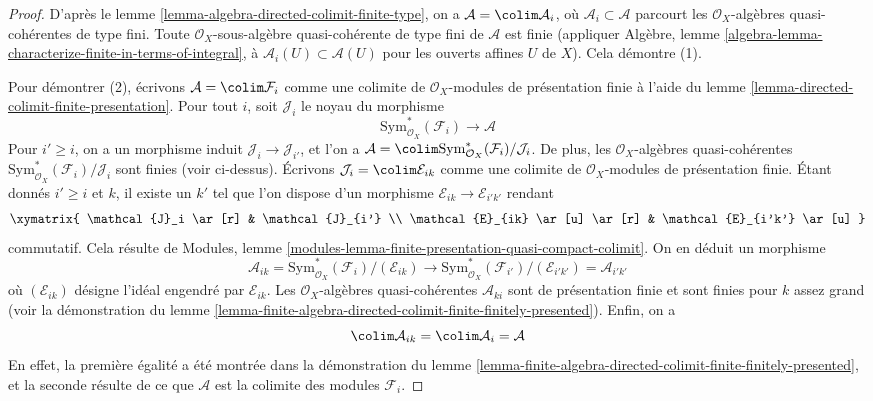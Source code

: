 \begin{proof}
D'après le lemme \ref{lemma-algebra-directed-colimit-finite-type}, on a
$\mathcal{A} = \colim \mathcal{A}_i$, où
$\mathcal{A}_i \subset \mathcal{A}$ parcourt
les $\mathcal{O}_X$-algèbres
quasi-cohérentes de type fini. Toute $\mathcal{O}_X$-sous-algèbre quasi-cohérente de type
fini de $\mathcal{A}$ est finie (appliquer Algèbre, lemme
\ref{algebra-lemma-characterize-finite-in-terms-of-integral},
à $\mathcal{A}_i(U) \subset \mathcal{A}(U)$ pour les ouverts affines $U$
de $X$). Cela démontre (1).

\medskip\noindent
Pour démontrer (2), écrivons $\mathcal{A} = \colim \mathcal{F}_i$
comme une colimite de $\mathcal{O}_X$-modules de présentation finie à
l'aide du lemme \ref{lemma-directed-colimit-finite-presentation}.
Pour tout $i$, soit $\mathcal{J}_i$ le noyau du morphisme
$$
\text{Sym}^*_{\mathcal{O}_X}(\mathcal{F}_i) \longrightarrow \mathcal{A}
$$
Pour $i' \geq i$, on a un morphisme induit $\mathcal{J}_i \to \mathcal{J}_{i'}$,
et l'on a $\mathcal{A} =
\colim \text{Sym}^*_{\mathcal{O}_X}(\mathcal{F}_i)/\mathcal{J}_i$.
De plus, les $\mathcal{O}_X$-algèbres quasi-cohérentes
$\text{Sym}^*_{\mathcal{O}_X}(\mathcal{F}_i)/\mathcal{J}_i$
sont finies (voir ci-dessus). Écrivons $\mathcal{J}_i = \colim \mathcal{E}_{ik}$
comme une colimite de $\mathcal{O}_X$-modules de présentation
finie. Étant donnés $i' \geq i$ et $k$, il existe un $k'$ tel que l'on
dispose d'un morphisme $\mathcal{E}_{ik} \to \mathcal{E}_{i'k'}$
rendant
$$
\xymatrix{
\mathcal{J}_i \ar[r] & \mathcal{J}_{i'} \\
\mathcal{E}_{ik} \ar[u] \ar[r] & \mathcal{E}_{i'k'} \ar[u]
}
$$
commutatif. Cela résulte de
Modules, lemme \ref{modules-lemma-finite-presentation-quasi-compact-colimit}.
On en déduit un morphisme
$$
\mathcal{A}_{ik} =
\text{Sym}^*_{\mathcal{O}_X}(\mathcal{F}_i)/(\mathcal{E}_{ik})
\longrightarrow
\text{Sym}^*_{\mathcal{O}_X}(\mathcal{F}_{i'})/(\mathcal{E}_{i'k'}) =
\mathcal{A}_{i'k'}
$$
où $(\mathcal{E}_{ik})$ désigne l'idéal engendré par $\mathcal{E}_{ik}$.
Les $\mathcal{O}_X$-algèbres quasi-cohérentes $\mathcal{A}_{ki}$
sont de présentation finie et sont finies pour $k$ assez grand (voir
la démonstration
du lemme \ref{lemma-finite-algebra-directed-colimit-finite-finitely-presented}).
Enfin, on a
$$
\colim \mathcal{A}_{ik} = \colim \mathcal{A}_i = \mathcal{A}
$$
En effet, la première égalité a été montrée dans la démonstration du
lemme \ref{lemma-finite-algebra-directed-colimit-finite-finitely-presented},
et la seconde résulte de ce que $\mathcal{A}$ est la colimite
des modules $\mathcal{F}_i$.
\end{proof}





